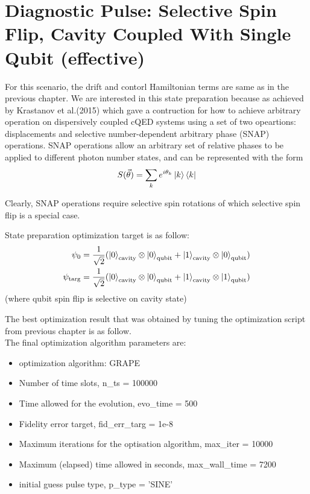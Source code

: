 \documentclass[12pt]{report}
\begin{document}
\section{Diagnostic Pulse: Selective Spin Flip, Cavity Coupled With Single Qubit (effective)}

For this scenario, the drift and contorl Hamiltonian terms are same as in the previous chapter. We are interested in this state 
preparation because as achieved by Krastanov et al.(2015) \cite{Krastanov2015} which gave a contruction for how to achieve arbitrary 
operation on dispersively coupled cQED systems using a set of two opeartions: displacements and selective number-dependent arbitrary phase (SNAP) operations. 
SNAP operations allow an arbitrary set of relative phases to be applied to different photon number states, and can be represented with the form
\begin{equation}
    S(\vec{\theta}) = \sum_k e^{i\theta_k} \ket{k}\bra{k}
\end{equation}

Clearly, SNAP operations require selective spin rotations of which selective spin flip is a special case.
\par
State preparation optimization target is as follow: 
\begin{align*}
    \psi_0 &= \frac{1}{\sqrt{2}} (\ket{0}_{\text{cavity}} \otimes \ket{0}_{\text{qubit}} 
                + \ket{1}_{\text{cavity}} \otimes \ket{0}_{\text{qubit}})\\
    \psi_{\text{targ}} &= \frac{1}{\sqrt{2}} (\ket{0}_{\text{cavity}} \otimes \ket{0}_{\text{qubit}} 
                + \ket{1}_{\text{cavity}} \otimes \ket{1}_{\text{qubit}})\\
\end{align*}
(where qubit spin flip is selective on cavity state)
\par
The best optimization result that was obtained by tuning the optimization script from 
previous chapter is as follow. 
\\
The final optimization algorithm parameters are:
\begin{itemize}
    \item optimization algorithm: GRAPE
    \item Number of time slots, n\_ts = 100000
    \item Time allowed for the evolution, evo\_time = 500
    \item Fidelity error target, fid\_err\_targ = 1e-8
    \item Maximum iterations for the optisation algorithm, max\_iter = 10000
    \item Maximum (elapsed) time allowed in seconds, max\_wall\_time = 7200
    \item initial guess pulse type, p\_type = 'SINE'
\end{itemize}
\end{document}
